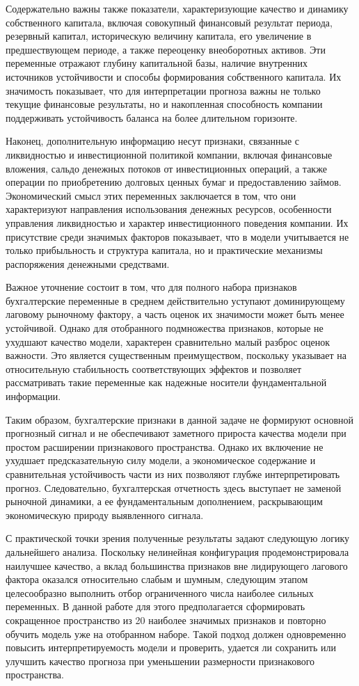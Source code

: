 \documentclass[
]{article}
\begin{document}
Содержательно важны также показатели, характеризующие качество и динамику собственного капитала, включая совокупный финансовый результат периода, резервный капитал, историческую величину капитала, его увеличение в предшествующем периоде, а также переоценку внеоборотных активов. Эти переменные отражают глубину капитальной базы, наличие внутренних источников устойчивости и способы формирования собственного капитала. Их значимость показывает, что для интерпретации прогноза важны не только текущие финансовые результаты, но и накопленная способность компании поддерживать устойчивость баланса на более длительном горизонте.

Наконец, дополнительную информацию несут признаки, связанные с ликвидностью и инвестиционной политикой компании, включая финансовые вложения, сальдо денежных потоков от инвестиционных операций, а также операции по приобретению долговых ценных бумаг и предоставлению займов. Экономический смысл этих переменных заключается в том, что они характеризуют направления использования денежных ресурсов, особенности управления ликвидностью и характер инвестиционного поведения компании. Их присутствие среди значимых факторов показывает, что в модели учитывается не только прибыльность и структура капитала, но и практические механизмы распоряжения денежными средствами.

Важное уточнение состоит в том, что для полного набора признаков бухгалтерские переменные в среднем действительно уступают доминирующему лаговому рыночному фактору, а часть оценок их значимости может быть менее устойчивой. Однако для отобранного подмножества признаков, которые не ухудшают качество модели, характерен сравнительно малый разброс оценок важности. Это является существенным преимуществом, поскольку указывает на относительную стабильность соответствующих эффектов и позволяет рассматривать такие переменные как надежные носители фундаментальной информации.

Таким образом, бухгалтерские признаки в данной задаче не формируют основной прогнозный сигнал и не обеспечивают заметного прироста качества модели при простом расширении признакового пространства. Однако их включение не ухудшает предсказательную силу модели, а экономическое содержание и сравнительная устойчивость части из них позволяют глубже интерпретировать прогноз. Следовательно, бухгалтерская отчетность здесь выступает не заменой рыночной динамики, а ее фундаментальным дополнением, раскрывающим экономическую природу выявленного сигнала.

С практической точки зрения полученные результаты задают следующую логику дальнейшего анализа. Поскольку нелинейная конфигурация продемонстрировала наилучшее качество, а вклад большинства признаков вне лидирующего лагового фактора оказался относительно слабым и шумным, следующим этапом целесообразно выполнить отбор ограниченного числа наиболее сильных переменных. В данной работе для этого предполагается сформировать сокращенное пространство из 20 наиболее значимых признаков и повторно обучить модель уже на отобранном наборе. Такой подход должен одновременно повысить интерпретируемость модели и проверить, удается ли сохранить или улучшить качество прогноза при уменьшении размерности признакового пространства.
\end{document}
